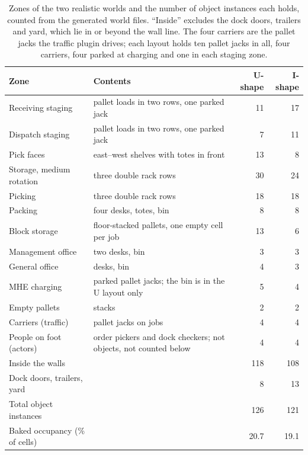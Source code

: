 \begin{table}[htbp]
\centering
\caption[Zones of the two realistic worlds and the number of object instances each holds.]{Zones of the two realistic worlds and the number of object instances
each holds, counted from the generated world files. ``Inside'' excludes the
dock doors, trailers and yard, which lie in or beyond the wall line. The four
carriers are the pallet jacks the traffic plugin drives; each layout holds ten
pallet jacks in all, four carriers, four parked at charging and one in each
staging zone. }
\label{tab:realistic-zones}
\small
\begin{tabularx}{\textwidth}{>{\raggedright\arraybackslash}p{}>{\raggedright\arraybackslash}Xrr}
\toprule
Zone & Contents & U-shape & I-shape \\
\midrule
Receiving staging & pallet loads in two rows, one parked jack & 11 & 17 \\
Dispatch staging & pallet loads in two rows, one parked jack & 7 & 11 \\
Pick faces & east--west shelves with totes in front & 13 & 8 \\
Storage, medium rotation & three double rack rows & 30 & 24 \\
Picking & three double rack rows & 18 & 18 \\
Packing & four desks, totes, bin & 8 & 8 \\
Block storage & floor-stacked pallets, one empty cell per job & 13 & 6 \\
Management office & two desks, bin & 3 & 3 \\
General office & desks, bin & 4 & 3 \\
MHE charging & parked pallet jacks; the bin is in the U layout only & 5 & 4 \\
Empty pallets & stacks & 2 & 2 \\
Carriers (traffic) & pallet jacks on jobs & 4 & 4 \\
People on foot (actors) & order pickers and dock checkers; not objects, not counted below & 4 & 4 \\
\midrule
Inside the walls & & 118 & 108 \\
Dock doors, trailers, yard & & 8 & 13 \\
Total object instances & & 126 & 121 \\
\midrule
Baked occupancy (\si{\percent} of cells) & & 20.7 & 19.1 \\
\bottomrule
\end{tabularx}
\end{table}

